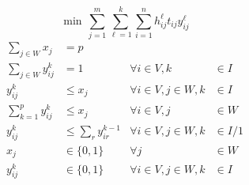 \begin{frame}[allowframebreaks]{}{}

{\small
  \begin{equation}
    \min \, \sum_{j=1}^{m}{\sum_{\ell=1}^{k}{\sum_{i=1}^{n}{h_{ij}^{\ell}t_{ij}y_{ij}^{\ell}}}}
  \end{equation}
}
{\small
  \begin{align}
    \sum_{j \in W}{x_j} & = p               &                                  &\\
    \sum_{j \in W}{y_{ij}^{k}} & = 1        &         \forall i \in V, k &\in I \\
    y_{ij}^{k} & \leq x_j                   & \forall i \in V,j \in W, k &\in I \\
    \sum_{k = 1}^{p}{y_{ij}^{k}} & \leq x_j &         \forall i \in V, j &\in W \\
    y_{ij}^{k} &\leq \sum_{r}{y_{ir}^{k-1}} & \forall i \in V,j \in W, k &\in I/{1} \\
    x_{j} & \in \{0,1\}      &                 \forall j &\in W \nonumber\\
    y_{ij}^{k} & \in \{0,1\} & \forall i \in V,j \in W,k &\in I \nonumber
  \end{align}
}
\end{frame}
